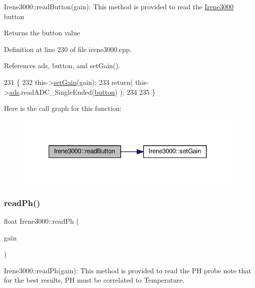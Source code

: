 Irene3000\+::read\+Button(gain)\+: This method is provided to read the \hyperlink{classIrene3000}{Irene3000} button

\begin{DoxyReturn}{Returns}
the button value 
\end{DoxyReturn}


Definition at line 230 of file irene3000.\+cpp.



References ads, button, and set\+Gain().


\begin{DoxyCode}
231 \{
232     this->\hyperlink{classIrene3000_aff7c5da186b388e7272e63ff88a20c34}{setGain}(gain);
233     \textcolor{keywordflow}{return}( this->\hyperlink{classIrene3000_a1215e77ba761c9908d80d691f149e135}{ads}.readADC\_SingleEnded(\hyperlink{Irene3000_8h_a37976ee6fe1fb8546bfd6153b83ffa6c}{button}) );
234     
235 \}
\end{DoxyCode}
Here is the call graph for this function\+:
\nopagebreak
\begin{figure}[H]
\begin{center}
\leavevmode
\includegraphics[width=328pt]{classIrene3000_ae0e0a5b773c3625b44c1d113c76a1540_cgraph}
\end{center}
\end{figure}
\mbox{\label{classIrene3000_abf3db725fabb0634ec889b32068a5eec}} 
\subsubsection{\texorpdfstring{read\+Ph()}{readPh()}}
{\footnotesize\ttfamily float Irene3000\+::read\+Ph (\begin{DoxyParamCaption}\item[{ads\+Gain\+\_\+t}]{gain }\end{DoxyParamCaption})}

Irene3000\+::read\+Ph(gain)\+: This method is provided to read the PH probe note that for the best results, PH must be correlated to Temperature.


